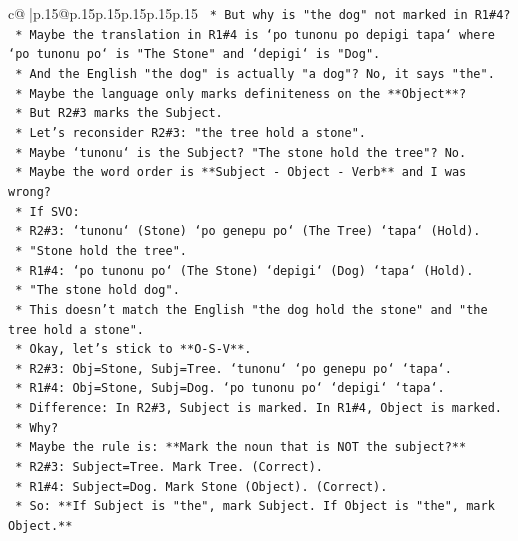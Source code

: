 \documentclass{article}
\begin{document}
{\begin{supertabular}{c@{$\;$}|p{.15\linewidth}@{}p{.15\linewidth}p{.15\linewidth}p{.15\linewidth}p{.15\linewidth}p{.15\linewidth}}
{{{\texttt{        *   But why is "the dog" not marked in R1\#4?} \\
\texttt{        *   Maybe the translation in R1\#4 is `po tunonu po depigi tapa` where `po tunonu po` is "The Stone" and `depigi` is "Dog".} \\
\texttt{        *   And the English "the dog" is actually "a dog"? No, it says "the".} \\
\texttt{        *   Maybe the language only marks definiteness on the **Object**?} \\
\texttt{        *   But R2\#3 marks the Subject.} \\
\texttt{        *   Let's reconsider R2\#3: "the tree hold a stone".} \\
\texttt{        *   Maybe `tunonu` is the Subject? "The stone hold the tree"? No.} \\
\texttt{        *   Maybe the word order is **Subject {-} Object {-} Verb** and I was wrong?} \\
\texttt{        *   If SVO:} \\
\texttt{            *   R2\#3: `tunonu` (Stone) `po genepu po` (The Tree) `tapa` (Hold).} \\
\texttt{            *   "Stone hold the tree".} \\
\texttt{            *   R1\#4: `po tunonu po` (The Stone) `depigi` (Dog) `tapa` (Hold).} \\
\texttt{            *   "The stone hold dog".} \\
\texttt{            *   This doesn't match the English "the dog hold the stone" and "the tree hold a stone".} \\
\texttt{        *   Okay, let's stick to **O{-}S{-}V**.} \\
\texttt{        *   R2\#3: Obj=Stone, Subj=Tree. `tunonu` `po genepu po` `tapa`.} \\
\texttt{        *   R1\#4: Obj=Stone, Subj=Dog. `po tunonu po` `depigi` `tapa`.} \\
\texttt{        *   Difference: In R2\#3, Subject is marked. In R1\#4, Object is marked.} \\
\texttt{        *   Why?} \\
\texttt{        *   Maybe the rule is: **Mark the noun that is NOT the subject?**} \\
\texttt{        *   R2\#3: Subject=Tree. Mark Tree. (Correct).} \\
\texttt{        *   R1\#4: Subject=Dog. Mark Stone (Object). (Correct).} \\
\texttt{        *   So: **If Subject is "the", mark Subject. If Object is "the", mark Object.**} \\
}}}
\end{supertabular}}
\end{document}
